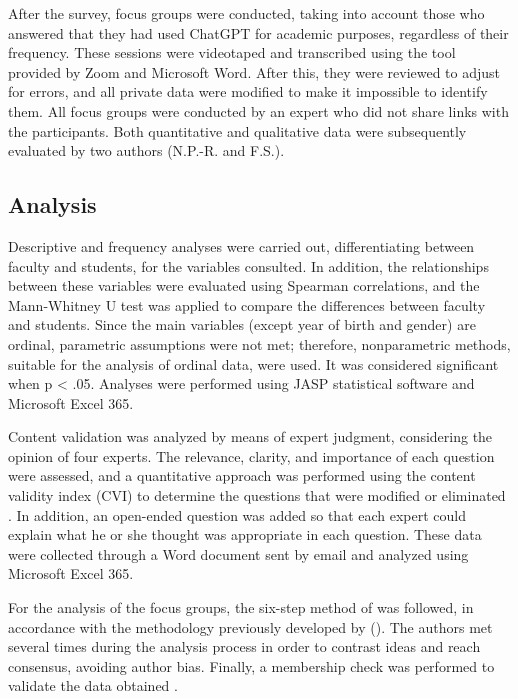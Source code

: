 \documentclass[english]{textolivre}
\begin{document}
After the survey, focus groups were conducted, taking into account those who answered that they had used ChatGPT for academic purposes, regardless of their frequency. These sessions were videotaped and transcribed using the tool provided by Zoom and Microsoft Word. After this, they were reviewed to adjust for errors, and all private data were modified to make it impossible to identify them. All focus groups were conducted by an expert who did not share links with the participants. Both quantitative and qualitative data were subsequently evaluated by two authors (N.P.-R. and F.S.).


\subsection{Analysis}\label{sec-modelo}
Descriptive and frequency analyses were carried out, differentiating between faculty and students, for the variables consulted. In addition, the relationships between these variables were evaluated using Spearman correlations, and the Mann-Whitney U test was applied to compare the differences between faculty and students. Since the main variables (except year of birth and gender) are ordinal, parametric assumptions were not met; therefore, nonparametric methods, suitable for the analysis of ordinal data, were used. It was considered significant when p < .05. Analyses were performed using JASP statistical software and Microsoft Excel 365.

Content validation was analyzed by means of expert judgment, considering the opinion of four experts. The relevance, clarity, and importance of each question were assessed, and a quantitative approach was performed using the content validity index (CVI) to determine the questions that were modified or eliminated \cite{desouza2017psicometricas,padilla2019validacion}. In addition, an open-ended question was added so that each expert could explain what he or she thought was appropriate in each question. These data were collected through a Word document sent by email and analyzed using Microsoft Excel 365.

For the analysis of the focus groups, the six-step method of \textcite{braun2006thematic} was followed, in accordance with the methodology previously developed by \textcite{kovacs2022pitfall} (). The authors met several times during the analysis process in order to contrast ideas and reach consensus, avoiding author bias. Finally, a membership check was performed to validate the data obtained \cite{mckim2023memberchecking}.
\end{document}
